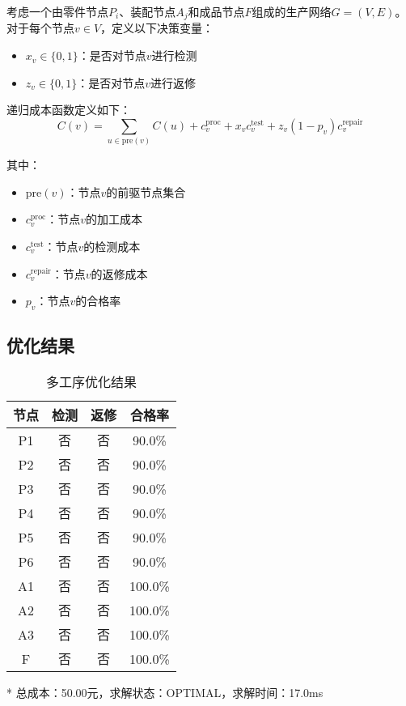 \documentclass[12pt]{article}
\begin{document}
考虑一个由零件节点$P_i$、装配节点$A_j$和成品节点$F$组成的生产网络$G=(V,E)$。
对于每个节点$v \in V$，定义以下决策变量：
\begin{itemize}
  \item $x_v \in \{0,1\}$：是否对节点$v$进行检测
  \item $z_v \in \{0,1\}$：是否对节点$v$进行返修
\end{itemize}

递归成本函数定义如下：
\begin{equation}
C(v) = \sum_{u \in \text{pre}(v)} C(u) + c_v^{\text{proc}} + x_v c_v^{\text{test}} + z_v(1-p_v)c_v^{\text{repair}}
\end{equation}

其中：
\begin{itemize}
  \item $\text{pre}(v)$：节点$v$的前驱节点集合
  \item $c_v^{\text{proc}}$：节点$v$的加工成本
  \item $c_v^{\text{test}}$：节点$v$的检测成本
  \item $c_v^{\text{repair}}$：节点$v$的返修成本
  \item $p_v$：节点$v$的合格率
\end{itemize}

\subsection{优化结果}

\begin{table}[htbp]
\centering
\caption{多工序优化结果}
\begin{threeparttable}
\begin{tabular}{@{}cccc@{}}
\toprule
节点 & 检测 & 返修 & 合格率 \\
\midrule
P1 & 否 & 否 & 90.0\% \\
P2 & 否 & 否 & 90.0\% \\
P3 & 否 & 否 & 90.0\% \\
P4 & 否 & 否 & 90.0\% \\
P5 & 否 & 否 & 90.0\% \\
P6 & 否 & 否 & 90.0\% \\
A1 & 否 & 否 & 100.0\% \\
A2 & 否 & 否 & 100.0\% \\
A3 & 否 & 否 & 100.0\% \\
F & 否 & 否 & 100.0\% \\
\bottomrule
\end{tabular}
\begin{tablenotes}
\item[*] 总成本：50.00元，求解状态：OPTIMAL，求解时间：17.0ms
\end{tablenotes}
\end{threeparttable}
\end{table}
\end{document}
